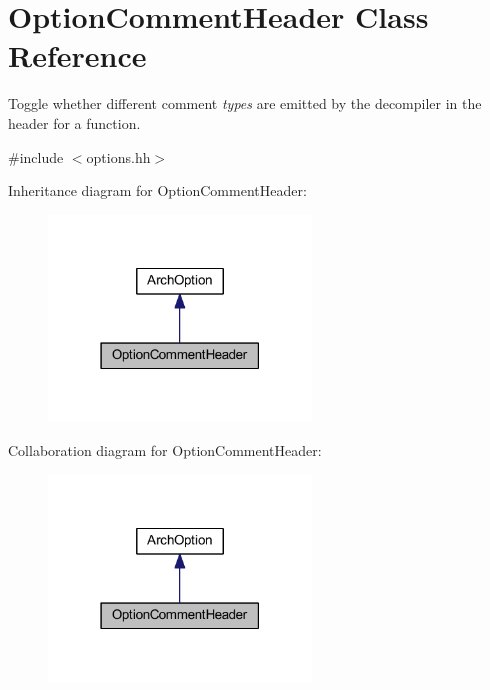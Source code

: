 \hypertarget{class_option_comment_header}{}\section{Option\+Comment\+Header Class Reference}
\label{class_option_comment_header}


Toggle whether different comment {\itshape types} are emitted by the decompiler in the header for a function.  




{\ttfamily \#include $<$options.\+hh$>$}



Inheritance diagram for Option\+Comment\+Header\+:
\nopagebreak
\begin{figure}[H]
\begin{center}
\leavevmode
\includegraphics[width=198pt]{class_option_comment_header__inherit__graph}
\end{center}
\end{figure}


Collaboration diagram for Option\+Comment\+Header\+:
\nopagebreak
\begin{figure}[H]
\begin{center}
\leavevmode
\includegraphics[width=198pt]{class_option_comment_header__coll__graph}
\end{center}
\end{figure}
